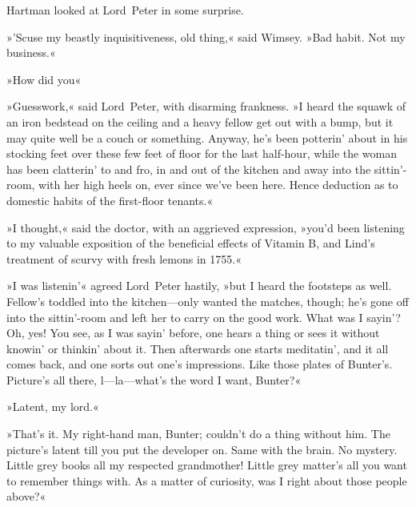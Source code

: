 Hartman looked at Lord~Peter in some surprise.

»'Scuse my beastly inquisitiveness, old thing,« said Wimsey. »Bad habit. Not my business.«

»How did you\longdash«

»Guesswork,« said Lord~Peter, with disarming frankness. »I heard the squawk of an iron bedstead on the ceiling and a heavy fellow get out with a bump, but it may quite well be a couch or something. Anyway, he's been potterin' about in his stocking feet over these few feet of floor for the last half-hour, while the woman has been clatterin' to and fro, in and out of the kitchen and away into the sittin'-room, with her high heels on, ever since we've been here. Hence deduction as to domestic habits of the first-floor tenants.«

»I thought,« said the doctor, with an aggrieved expression, »you'd been listening to my valuable exposition of the beneficial effects of Vitamin B, and Lind's treatment of scurvy with fresh lemons in 1755.«

»I was listenin'« agreed Lord~Peter hastily, »but I heard the footsteps as well. Fellow's toddled into the kitchen—only wanted the matches, though; he's gone off into the sittin'-room and left her to carry on the good work. What was I sayin'? Oh, yes! You see, as I was sayin' before, one hears a thing or sees it without knowin' or thinkin' about it. Then afterwards one starts meditatin', and it all comes back, and one sorts out one's impressions. Like those plates of Bunter's. Picture's all there, l—la—what's the word I want, Bunter?«

»Latent, my lord.«

»That's it. My right-hand man, Bunter; couldn't do a thing without him. The picture's latent till you put the developer on. Same with the brain. No mystery. Little grey books all my respected grandmother! Little grey matter's all you want to remember things with. As a matter of curiosity, was I right about those people above?«

